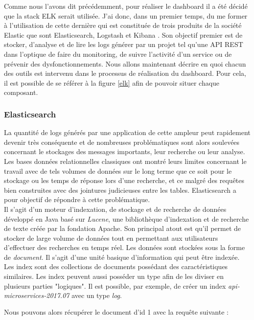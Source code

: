 	Comme nous l'avons dit précédemment, pour réaliser le dashboard il a été décidé que la stack ELK serait utilisée. J'ai donc, dans un premier temps, du me former à l'utilisation de cette dernière qui est constituée de trois produits de la société Elastic que sont Elasticsearch, Logstash et Kibana \cite{bib_elk2}. Son objectif premier est de stocker, d'analyse et de lire les logs générer par un projet tel qu'une API REST dans l'optique de faire du monitoring, de suivre l'activité d'un service ou de prévenir des dysfonctionnements. Nous allons maintenant décrire en quoi chacun des outils est intervenu dans le processus de réalisation du dashboard. Pour cela, il est possible de se référer à la figure \ref{elk} afin de pouvoir situer chaque composant.

	\subsubsection{Elasticsearch}
	La quantité de logs générés par une application de cette ampleur peut rapidement devenir très conséquente et de nombreuses problématiques sont alors soulevées concernant le stockages des messages importants, leur recherche ou leur analyse. Les bases données relationnelles classiques ont montré leurs limites concernant le travail avec de tels volumes de données sur le long terme que ce soit pour le stockage ou les temps de réponse lors d'une recherche, et ce malgré des requêtes bien construites avec des jointures judicieuses entre les tables. Elasticsearch a pour objectif de répondre à cette problématique. \\
	
	Il s'agit d'un moteur d'indexation, de stockage et de recherche de données développé en Java basé sur \textit{Lucene}, une bibliothèque d'indexation et de recherche de texte créée par la fondation Apache. Son principal atout est qu'il permet de stocker de large volume de données tout en permettant aux utilisateurs d'effectuer des recherches en temps réel. Les données sont stockées sous la forme de \textit{document}. Il s'agit d'une unité basique d'information qui peut être indexée. Les index sont des collections de documents possédant des caractéristiques similaires. Les index peuvent aussi posséder un type afin de les diviser en plusieurs parties "logiques". Il est possible, par exemple, de créer un index \textit{api-microservices-2017.07} avec un type \textit{log}. 
	
	Nous pouvons alors récupérer le document d'id 1 avec la requête suivante :	

